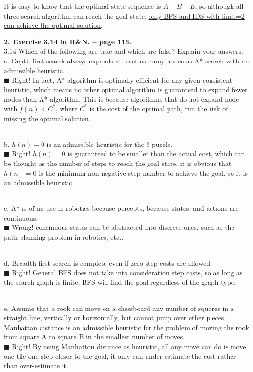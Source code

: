 \documentclass{article}
\begin{document}
It is easy to know that the optimal state sequence is $A-B-E$, so
although all three search algorithm can reach the goal state,
\underline{only BFS and IDS with limit=2 can achieve the optimal
  solution}. \normalfont

\newcommand{\solution}[1]{~\\ $\blacksquare$ \sffamily\upshape\selectfont #1
\normalfont ~\\~ }

\textbf{2. Exercise 3.14 in R\&N. -- page 116.} \\
3.14 Which of the following are true and which are false? Explain your
answers. \\ 
a. Depth-first search always expands at least as many nodes as A*
search with an admissible heuristic. 
\solution{Right! In fact, A* algorithm is optimally efficient for any given
  consistent heuristic, which means no other optimal algorithm is
  guaranteed to expand fewer nodes than A* algorithm. This is because
  algorithms that do not expand node with $f(n)<C^*$, where $C^*$ is
  the cost of the optimal path, run the risk of missing the optimal
  solution. }

b. $h(n) = 0$ is an admissible heuristic for the 8-puzzle. 
\solution{Right! $h(n)=0$ is guaranteed to be smaller than the actual
  cost, which can be thought as the number of steps to reach the goal
  state, it is obvious that $h(n)=0$ is the minimum non-negative step
  number to achieve the goal, so it is an admissible heuristic. }

c. A* is of no use in robotics because percepts, because states, and actions
are continuous. 
\solution{Wrong! continuous states can be abstracted into discrete
  ones, such as the path planning problem in robotics, etc..  }

d. Breadth-first search is complete even if zero step costs are
allowed. 
\solution{Right! General BFS does not take into consideration step
  costs, so as long as the search graph is finite, BFS will find the
  goal regardless of the graph type. } 

e. Assume that a rook can move on a chessboard any number of squares
in a straight line, vertically or horizontally, but cannot jump over
other pieces. Manhattan distance is an admissible heuristic for the
problem of moving the rook from square A to square B in the smallest
number of moves. 
\solution{Right! By using Manhatton distance as heuristic, all any
  move can do is move one tile one step closer to the goal, it only
  can under-estimate the cost rather than over-estimate it. }
\end{document}
